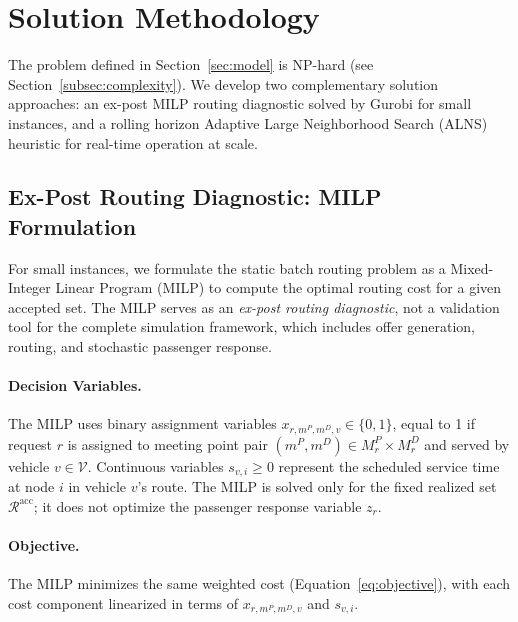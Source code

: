 
\section{Solution Methodology}\label{sec:algorithm}

The problem defined in Section~\ref{sec:model} is NP-hard (see
Section~\ref{subsec:complexity}). We develop two complementary solution approaches: an
ex-post MILP routing diagnostic solved by Gurobi for small instances, and a rolling horizon
Adaptive Large Neighborhood Search (ALNS) heuristic for real-time operation at scale.

\subsection{Ex-Post Routing Diagnostic: MILP Formulation}\label{subsec:milp}

For small instances, we formulate the static batch routing problem as a
Mixed-Integer Linear Program (MILP) to compute the optimal routing cost for a
given accepted set. The MILP serves as an \emph{ex-post routing diagnostic},
not a validation tool for the complete simulation framework, which includes
offer generation, routing, and stochastic passenger response.

\paragraph{Decision Variables.}
The MILP uses binary assignment variables $x_{r,m^P,m^D,v} \in \{0,1\}$, equal to 1 if
request $r$ is assigned to meeting point pair $(m^P, m^D) \in M_r^P \times M_r^D$ and
served by vehicle $v \in \mathcal{V}$. Continuous variables $s_{v,i} \geq 0$ represent
the scheduled service time at node $i$ in vehicle $v$'s route. The MILP is solved
only for the fixed realized set $\mathcal{R}^{\text{acc}}$; it does not optimize
the passenger response variable $z_r$.

\paragraph{Objective.}
The MILP minimizes the same weighted cost (Equation~\ref{eq:objective}), with each cost
component linearized in terms of $x_{r,m^P,m^D,v}$ and $s_{v,i}$.


